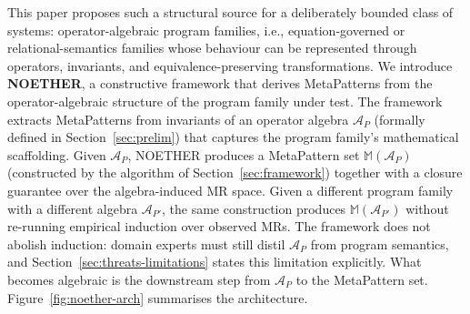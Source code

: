 \documentclass[acmsmall,screen,anonymous,review]{acmart}
\begin{document}
This paper proposes such a structural source for a deliberately bounded class of systems: operator-algebraic program families, i.e., equation-governed or relational-semantics families whose behaviour can be represented through operators, invariants, and equivalence-preserving transformations. We introduce \textbf{NOETHER}, a constructive framework that derives MetaPatterns from the operator-algebraic structure of the program family under test. The framework extracts MetaPatterns from invariants of an operator algebra $\mathcal{A}_P$ (formally defined in Section~\ref{sec:prelim}) that captures the program family's mathematical scaffolding. Given $\mathcal{A}_P$, NOETHER produces a MetaPattern set $\mathbb{M}(\mathcal{A}_P)$ (constructed by the algorithm of Section~\ref{sec:framework}) together with a closure guarantee over the algebra-induced MR space. Given a different program family with a different algebra $\mathcal{A}_{P'}$, the same construction produces $\mathbb{M}(\mathcal{A}_{P'})$ without re-running empirical induction over observed MRs. The framework does not abolish induction: domain experts must still distil $\mathcal{A}_P$ from program semantics, and Section~\ref{sec:threats-limitations} states this limitation explicitly. What becomes algebraic is the downstream step from $\mathcal{A}_P$ to the MetaPattern set. Figure~\ref{fig:noether-arch} summarises the architecture.
\end{document}
